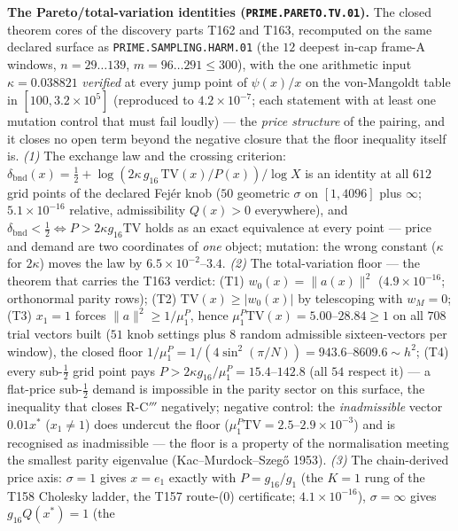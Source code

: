 \documentclass[11pt,a4paper]{article}
\begin{document}
\par\smallskip\noindent\textbf{The Pareto/total-variation identities
(\texttt{PRIME.PARETO.TV.01}).}
The closed theorem cores of the discovery parts T162 and T163,
recomputed on the same declared surface as
\texttt{PRIME.SAMPLING.HARM.01} (the $12$ deepest in-cap frame-A
windows, $n=29\ldots139$, $m=96\ldots291\le300$), with the one
arithmetic input $\kappa=0.038821$ \emph{verified} at every jump point
of $\psi(x)/x$ on the von-Mangoldt table in $[100,3.2\times10^{5}]$
(reproduced to $4.2\times10^{-7}$; each statement with at least one
mutation control that must fail loudly) --- the \emph{price structure}
of the pairing, and it closes no open term beyond the negative closure
that the floor inequality itself is. \emph{(1)} The exchange law and
the crossing criterion:
$\delta_{\mathrm{bnd}}(x)=\tfrac12+\log(2\kappa\,g_{16}\,
\mathrm{TV}(x)/P(x))/\log X$ is an identity at all $612$ grid points of
the declared Fej\'er knob ($50$ geometric $\sigma$ on $[1,4096]$ plus
$\infty$; $5.1\times10^{-16}$ relative, admissibility $Q(x)>0$
everywhere), and $\delta_{\mathrm{bnd}}<\tfrac12\iff
P>2\kappa g_{16}\mathrm{TV}$ holds as an exact equivalence at every
point --- price and demand are two coordinates of \emph{one} object;
mutation: the wrong constant ($\kappa$ for $2\kappa$) moves the law by
$6.5\times10^{-2}$--$3.4$. \emph{(2)} The total-variation floor --- the
theorem that carries the T163 verdict: (T1) $w_0(x)=\|a(x)\|^2$
($4.9\times10^{-16}$; orthonormal parity rows); (T2)
$\mathrm{TV}(x)\ge|w_0(x)|$ by telescoping with $w_M=0$; (T3) $x_1=1$
forces $\|a\|^2\ge1/\mu^P_1$, hence
$\mu^P_1\mathrm{TV}(x)=5.00$--$28.84\ge1$ on all $708$ trial vectors
built ($51$ knob settings plus $8$ random admissible sixteen-vectors
per window), the closed floor
$1/\mu^P_1=1/(4\sin^2(\pi/N))=943.6$--$8609.6\sim h^2$; (T4) every
sub-$\tfrac12$ grid point pays
$P>2\kappa g_{16}/\mu^P_1=15.4$--$142.8$ (all $54$ respect it) --- a
flat-price sub-$\tfrac12$ demand is impossible in the parity sector on
this surface, the inequality that closes R-C$'''$ negatively; negative
control: the \emph{inadmissible} vector $0.01x^*$ ($x_1\ne1$) does
undercut the floor ($\mu^P_1\mathrm{TV}=2.5$--$2.9\times10^{-3}$) and
is recognised as inadmissible --- the floor is a property of the
normalisation meeting the smallest parity eigenvalue
(Kac--Murdock--Szeg\H{o} 1953). \emph{(3)} The chain-derived price
axis: $\sigma=1$ gives $x=e_1$ exactly with $P=g_{16}/g_1$ (the $K=1$
rung of the T158 Cholesky ladder, the T157 route-(0) certificate;
$4.1\times10^{-16}$), $\sigma=\infty$ gives $g_{16}Q(x^*)=1$ (the
\end{document}
